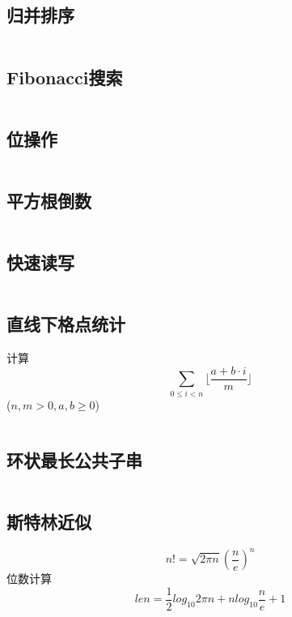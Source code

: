 \documentclass[a4paper]{article}
\newcommand{\cppcode}[1]{
    \inputminted[mathescape]{cpp}{#1}
}
\begin{document}
\cppcode{tricks/binary-search.cpp}

\subsection{归并排序}

\cppcode{tricks/merge-sort.cpp}

\subsection{Fibonacci搜索}

\cppcode{tricks/Fibonacci-Search.cpp}

\subsection{位操作}

\cppcode{tricks/Bit-operation.cpp}

\subsection{平方根倒数}

\cppcode{tricks/Fast-Inverse-Square-Root.cpp}

\subsection{快速读写}

\cppcode{tricks/FastIO.cpp}

\subsection{直线下格点统计}

计算$$\sum_{0 \leq i < n} \lfloor \frac{a + b \cdot i}{m} \rfloor$$
($n, m > 0, a, b \geq 0$)
\cppcode{lattice-count.cpp}


\subsection{环状最长公共子串}

\cppcode{cyclic-longest-common-string.cpp}

\subsection{斯特林近似}

$$ n! = \sqrt{2 \pi n} (\frac{n}{e})^{n} $$
位数计算 $$ len = \frac{1}{2} log_{10}2 \pi n + nlog_{10}\frac{n}{e} + 1 $$
\end{document}
